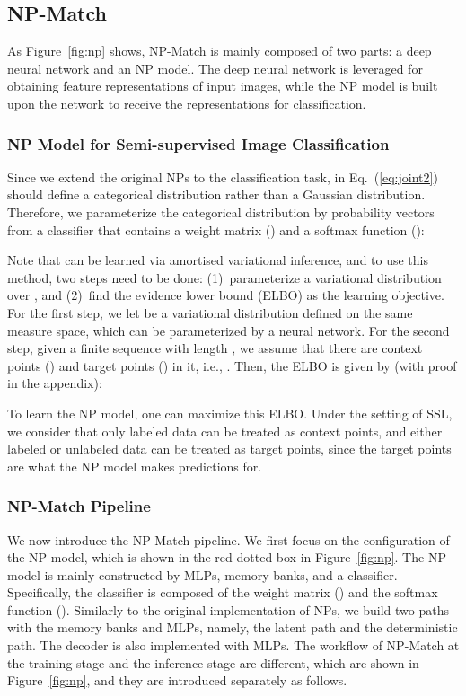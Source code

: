 \documentclass[nohyperref]{article}
\theoremstyle{plain}
\theoremstyle{definition}
\theoremstyle{remark}
\begin{document}
\subsection{NP-Match}
As Figure~\ref{fig:np} shows, NP-Match is mainly composed of two parts: a deep neural network and an NP model. The deep neural network is leveraged for obtaining feature representations of input images, while the NP model is built upon the network to receive the representations for classification. 

\subsubsection{NP Model for Semi-supervised Image Classification} 
Since we extend the original NPs \cite{garnelo2018neural} to the classification task,  in Eq.~(\ref{eq:joint2})  should define a categorical distribution rather than a Gaussian distribution. Therefore, we parameterize the categorical distribution by probability vectors from a classifier that contains a weight matrix () and a softmax function ():

Note that  can be learned via amortised variational inference, and to use this method, two steps need to be done: (1)~parameterize a variational distribution over , and  (2)~find the evidence lower bound (ELBO) as the learning objective. For the first step, we let  be a variational distribution defined on the same measure space, which can be parameterized by a neural network. For the second step, 
given a finite sequence with length , we assume that there are  context points () and  target points () in it, i.e., . Then, the ELBO is given by  (with proof in the appendix):

To learn the NP model, one can maximize this ELBO. Under the setting of SSL, we consider that only labeled data can be treated as context points, and either labeled or unlabeled data can be treated as target points, since the target points are what the NP model makes predictions for.


\subsubsection{NP-Match Pipeline} 
 
We now introduce the NP-Match pipeline.
We first focus on the configuration of the NP model, which is shown in the red dotted box in Figure~\ref{fig:np}. 
The NP model is mainly constructed by MLPs, memory banks, and a classifier. Specifically, the classifier is composed of the weight matrix () and the softmax function (). Similarly to the original implementation of NPs, we build two paths with the memory banks and MLPs, namely, the latent path and the deterministic path. The decoder  is also implemented with MLPs. 
The workflow of NP-Match at the training stage and the inference stage are different, which are shown in Figure~\ref{fig:np}, and they are introduced separately as follows.
\end{document}
